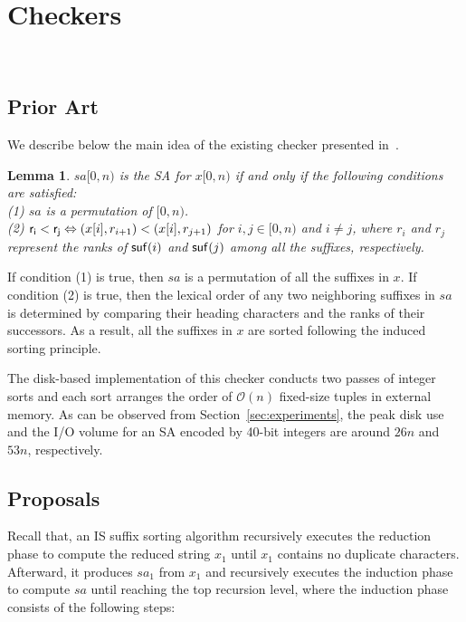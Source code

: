\documentclass[10pt,journal,compsoc]{IEEEtran}
\newtheorem{lemma}[theorem]{Lemma}
\begin{document}
\section{Checkers}~\label{sec:checkers}

\subsection{Prior Art} \label{sec:checkers:prior_art}

We describe below the main idea of the existing checker presented in~\cite{Dementiev2008a}.

\begin{lemma} \label{lemma:1}
	$sa[0, n)$ is the SA for $x[0, n)$ if and only if the following conditions are satisfied:\\
	(1) $sa$ is a permutation of $[0, n)$. \\	
	(2) ${\sf r_i < r_j} \Leftrightarrow (x[i], r_{i + 1}) < (x[i], r_{j + 1})$ for $ i, j \in [0, n)$ and $i\ne j$, where $r_i$ and $r_j$ represent the ranks of ${\sf suf}(i)$ and ${\sf suf}(j)$ among all the suffixes, respectively. \\
\end{lemma}

\begin{IEEEproof} If condition (1) is true, then $sa$ is a permutation of all the suffixes in $x$. If condition (2) is true, then the lexical order of any two neighboring suffixes in $sa$ is determined by comparing their heading characters and the ranks of their successors. As a result, all the suffixes in $x$ are sorted following the induced sorting principle.

\end{IEEEproof}

The disk-based implementation of this checker conducts two passes of integer sorts and each sort arranges the order of $\mathcal{O}(n)$ fixed-size tuples in external memory. As can be observed from Section~\ref{sec:experiments}, the peak disk use and the I/O volume for an SA encoded by 40-bit integers are around $26n$ and $53n$, respectively.

\subsection{Proposals} \label{sec:checkers:proposals}

Recall that, an IS suffix sorting algorithm recursively executes the reduction phase to compute the reduced string $x_1$ until $x_1$ contains no duplicate characters. Afterward, it produces $sa_1$ from $x_1$ and recursively executes the induction phase to compute $sa$ until reaching the top recursion level, where the induction phase consists of the following steps:
\end{document}
